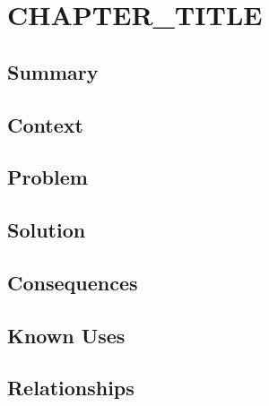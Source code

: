\chapter{CHAPTER_TITLE}

\section{Summary}
\section{Context}
\section{Problem}
\section{Solution}
\section{Consequences}
\section{Known Uses}
\section{Relationships}


